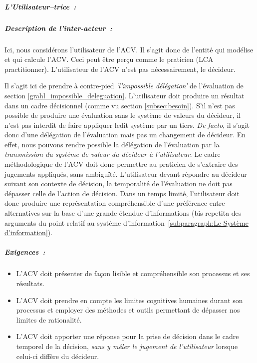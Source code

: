  
 \subparagraph{L'Utilisateur--trice~:}
 \subparagraph{Description de l'inter-acteur~:}
 Ici, nous considérons l'utilisateur de l'\gls{ACV}.
 Il s'agit donc de l'entité qui modélise et qui calcule l'\gls{ACV}.
 Ceci peut être perçu comme le praticien (LCA practitionner).
 L'utilisateur de l'\gls{ACV} n'est pas nécessairement, le décideur.
 
 Il s'agit ici de prendre à contre-pied \emph{`l'impossible délégation'} de l'évaluation de \citeauthor{grahl_evaluation_1996} section \ref{grahl_impossible_deleguation}.\label{délégation de valeurs2}
 L'utilisateur doit produire un résultat dans un cadre décisionnel (comme vu section \ref{subsec:besoin}).
 S'il n'est pas possible de produire une évaluation sans le système de valeurs du décideur, il n'est pas interdit de faire appliquer ledit système par un tiers.
 \textit{De facto}, il s'agit donc d'une délégation de l'évaluation mais pas un changement de décideur.
 En effet, nous pouvons rendre possible la délégation de l'évaluation par la \emph{transmission du système de valeur du décideur à l'utilisateur}.
 Le cadre méthodologique de l'\gls{ACV} doit donc permettre au praticien de s'extraire des jugements appliqués, sans ambiguïté.
 L'utilisateur devant répondre au décideur suivant son contexte de décision, la temporalité de l'évaluation ne doit pas dépasser celle de l'action de décision.
 Dans un temps limité, l'utilisateur doit donc produire une représentation compréhensible d'une préférence entre alternatives sur la base d'une grande étendue d'informations (bis repetita des arguments du point relatif au système d'information~\ref{subparagraph:Le Système d'information}). %
  \subparagraph{Exigences~:}
 \begin{itemize}[noitemsep,topsep=0pt,parsep=0pt,partopsep=0pt]
  \item L'\gls{ACV} doit présenter de façon lisible et compréhensible son processus et ses résultats.
  \item L'\gls{ACV} doit prendre en compte les limites cognitives humaines durant son processus et employer des méthodes et outils permettant de dépasser nos limites de rationalité.
  \item L'\gls{ACV} doit apporter une réponse pour la prise de décision dans le cadre temporel de la décision, \emph{sans y mêler le jugement de l'utilisateur} lorsque celui-ci diffère du décideur.
 \end{itemize}

